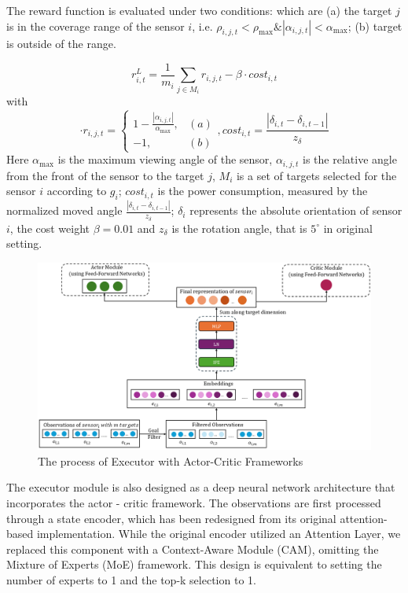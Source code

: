 \documentclass[preprint,12pt]{elsarticle}
\begin{document}
The reward function is evaluated under two conditions: which are (a) the target $j$ is in the coverage range of the sensor $i$, i.e. $\rho_{i,j,t} < \rho_{\text{max}} \& |\alpha_{i,j,t}| < \alpha_{\text{max}}$; (b) target is outside of the range. 

\[
    r^L_{i,t} = \frac{1}{m_i} \sum_{j \in M_i} r_{i,j,t} - \beta \cdot cost_{i,t} 
\]
with
\[
\cdot r_{i,j,t} = 
    \begin{cases} 
    1 - \frac{|\alpha_{i,j,t}|}{\alpha_{\text{max}}}, & (a) \\ 
    -1, & (b)
    \end{cases} ,    cost_{i,t} = \frac{|\delta_{i,t} - \delta_{i,t-1}|}{z_{\delta}}
\]
Here $\alpha_{\text{max}}$ is the maximum viewing angle of the sensor, $\alpha_{i,j,t}$ is the relative angle from the front of the sensor to the target $j$, $M_i$ is a set of targets selected for the sensor $i$ according to $g_i$; $cost_{i,t}$ is the power consumption, measured by the normalized moved angle $\frac{|\delta_{i,t} - \delta_{i,t-1}|}{z_{\delta}}$; $\delta_i$ represents the absolute orientation of sensor $i$, the cost weight $\beta = 0.01$ and $z_{\delta}$ is the rotation angle, that is $5^\circ$ in original setting.

\begin{figure}[h]
    \centering  \includegraphics[width=\linewidth]{graphics/Executor.png}
    \caption{The process of Executor with Actor-Critic Frameworks}
    \label{fig:executor}
    
\end{figure}

The executor module is also designed as a deep neural network architecture that incorporates the actor - critic framework. The observations are first processed through a state encoder, which has been redesigned from its original attention-based implementation. While the original encoder utilized an Attention Layer, we replaced this component with a Context-Aware Module (CAM), omitting the Mixture of Experts (MoE) framework. This design is equivalent to setting the number of experts to 1 and the top-k selection to 1.
\end{document}
